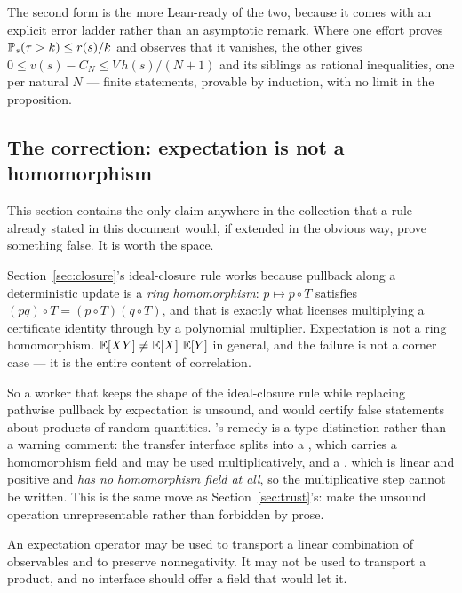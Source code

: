 The second form is the more Lean-ready of the two, because it comes with an
explicit error ladder rather than an asymptotic remark. Where one effort proves
$\operatorname{\mathbb{P}}_s(\tau>k)\le r(s)/k$ and observes that it vanishes, the other gives
$0\le v(s)-C_N\le V\,h(s)/(N+1)$ and its siblings as rational inequalities, one
per natural $N$ --- finite statements, provable by induction, with no limit in
the proposition.

\subsection{The correction: expectation is not a homomorphism}

\label{sec:moment-correction}
This section contains the only claim anywhere in the collection that a rule
already stated in this document would, if extended in the obvious way, prove
something false. It is worth the space.

Section~\ref{sec:closure}'s ideal-closure rule works because pullback along a
deterministic update is a \emph{ring homomorphism}: $p\mapsto p\circ T$
satisfies $(pq)\circ T=(p\circ T)(q\circ T)$, and that is exactly what licenses
multiplying a certificate identity through by a polynomial multiplier.
Expectation is not a ring homomorphism. $\operatorname{\mathbb{E}}[XY]\ne\operatorname{\mathbb{E}}[X]\,\operatorname{\mathbb{E}}[Y]$ in general, and
the failure is not a corner case --- it is the entire content of correlation.

So a worker that keeps the shape of the ideal-closure rule while replacing
pathwise pullback by expectation is unsound, and would certify false
statements about products of random quantities. 's remedy is a type
distinction rather than a warning comment: the transfer interface splits into
a , which carries a homomorphism field and may be used
multiplicatively, and a , which is linear and positive and
\emph{has no homomorphism field at all}, so the multiplicative step cannot be
written. This is the same move as
Section~\ref{sec:trust}'s: make the unsound operation unrepresentable rather
than forbidden by prose.

\begin{invariant}
\label{inv:moment}
An expectation operator may be used to transport a linear combination of
observables and to preserve nonnegativity. It may not be used to transport a
product, and no interface should offer a field that would let it.
\end{invariant}

